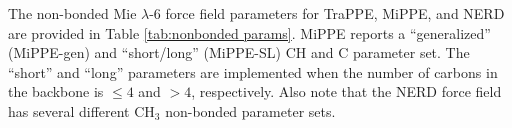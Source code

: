 \documentclass[journal=jced,manuscript=article]{achemso}
\begin{document}
    The non-bonded Mie $\lambda$-6 force field parameters for TraPPE, MiPPE, and NERD are provided in Table \ref{tab:nonbonded params}. MiPPE reports a ``generalized'' (MiPPE-gen) and ``short/long'' (MiPPE-SL) CH and C parameter set. The ``short'' and ``long'' parameters are implemented when the number of carbons in the backbone is $\le 4$ and $> 4$, respectively. Also note that the NERD force field has several different CH$_3$ non-bonded parameter sets.
    
\end{document}
